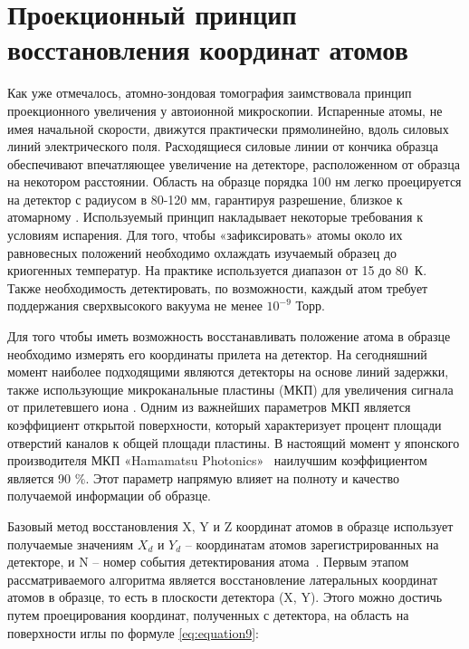 \FloatBarrier

\section{Проекционный принцип восстановления координат атомов}\label{sec:ch1/sec3}

Как уже отмечалось, атомно-зондовая томография заимствовала принцип проекционного увеличения у автоионной микроскопии. Испаренные атомы, не имея начальной скорости,  движутся практически прямолинейно, вдоль силовых линий электрического поля. Расходящиеся силовые линии от кончика образца обеспечивают впечатляющее увеличение на детекторе, расположенном от образца на некотором расстоянии. Область на образце порядка 100 нм легко проецируется на детектор с радиусом в 80-120 мм, гарантируя разрешение, близкое к атомарному \cite{Cadel09}. Используемый принцип накладывает некоторые требования к условиям испарения. Для того, чтобы «зафиксировать» атомы около их равновесных положений необходимо охлаждать изучаемый образец до криогенных температур. На практике используется диапазон от 15 до 80~К. Также необходимость детектировать, по возможности, каждый атом требует поддержания сверхвысокого вакуума не менее $10^{-9}$ Торр.

Для того чтобы иметь возможность восстанавливать положение атома в образце необходимо измерять его координаты прилета на детектор. На сегодняшний момент наиболее подходящими являются детекторы на основе линий задержки, также использующие микроканальные пластины (МКП) для увеличения сигнала от прилетевшего иона \cite{DaCosta05,Jagutzki05}. Одним из важнейших параметров МКП является коэффициент открытой поверхности, который характеризует процент площади отверстий каналов к общей площади пластины. В настоящий момент у японского производителя МКП «Hamamatsu Photonics»~\cite{Hamamatsu} наилучшим коэффициентом является 90 $\%$. Этот параметр напрямую влияет на полноту и качество получаемой информации об образце.

Базовый метод восстановления X, Y и Z координат атомов в образце использует получаемые значениям $X_d$ и $Y_d$ – координатам атомов зарегистрированных на детекторе, и N – номер события детектирования атома~\cite{Bas95}. Первым этапом рассматриваемого алгоритма является восстановление латеральных координат атомов в образце, то есть в плоскости детектора (X, Y). Этого можно достичь путем проецирования координат, полученных с детектора, на область на поверхности иглы по формуле \cref{eq:equation9}:

